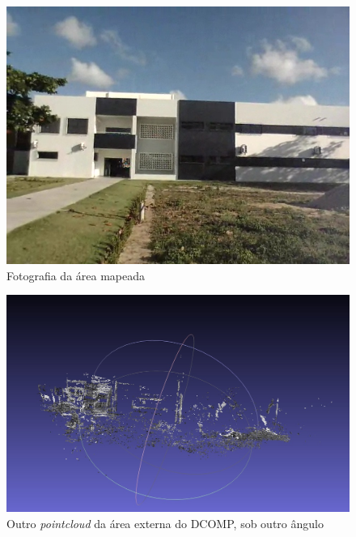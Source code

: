 \begin{figure}[!htb]
	\centering
		\includegraphics[width= \textwidth]{Imagens/figura4-7.jpg}
	\caption{Fotografia da área mapeada}
	\label{fig4:7}
\end{figure}

\begin{figure}[!htb]
	\centering
		\includegraphics[width= \textwidth]{Imagens/figura4-8.jpg}
	\caption{Outro \textit{pointcloud} da área externa do DCOMP, sob outro ângulo}
	\label{fig4:8}
\end{figure}

